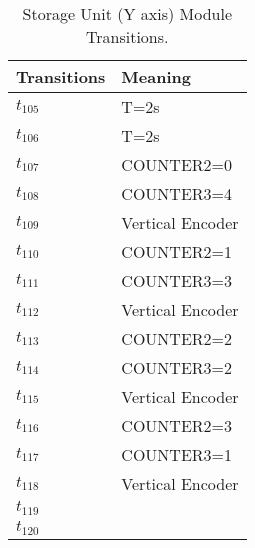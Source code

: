\begin{table}[H]
\caption{Storage Unit (Y axis) Module Transitions.}
\centering
\begin{tabular}{M{5cm}M{10cm}}
Transitions & Meaning\\
\hline
\hyperlink{partialNet:tt1051}{\hypertarget{partialTable:tt105}{$t_{105}$}} & T=2s\\
\hyperlink{partialNet:tt1061}{\hypertarget{partialTable:tt106}{$t_{106}$}} & T=2s\\
\hyperlink{partialNet:t1071}{\hypertarget{partialTable:t107}{$t_{107}$}} & COUNTER2=0\\
\hyperlink{partialNet:t1081}{\hypertarget{partialTable:t108}{$t_{108}$}} & COUNTER3=4\\
\hyperlink{partialNet:t1091}{\hypertarget{partialTable:t109}{$t_{109}$}} & Vertical Encoder\\
\hyperlink{partialNet:t1101}{\hypertarget{partialTable:t110}{$t_{110}$}} & COUNTER2=1\\
\hyperlink{partialNet:t1111}{\hypertarget{partialTable:t111}{$t_{111}$}} & COUNTER3=3\\
\hyperlink{partialNet:t1121}{\hypertarget{partialTable:t112}{$t_{112}$}} & Vertical Encoder\\
\hyperlink{partialNet:t1131}{\hypertarget{partialTable:t113}{$t_{113}$}} & COUNTER2=2\\
\hyperlink{partialNet:t1141}{\hypertarget{partialTable:t114}{$t_{114}$}} & COUNTER3=2\\
\hyperlink{partialNet:t1151}{\hypertarget{partialTable:t115}{$t_{115}$}} & Vertical Encoder\\
\hyperlink{partialNet:t1161}{\hypertarget{partialTable:t116}{$t_{116}$}} & COUNTER2=3\\
\hyperlink{partialNet:t1171}{\hypertarget{partialTable:t117}{$t_{117}$}} & COUNTER3=1\\
\hyperlink{partialNet:t1181}{\hypertarget{partialTable:t118}{$t_{118}$}} & Vertical Encoder\\
\hyperlink{partialNet:t1191}{\hypertarget{partialTable:t119}{$t_{119}$}} & \\
\hyperlink{partialNet:t1201}{\hypertarget{partialTable:t120}{$t_{120}$}} & \\
\end{tabular}
\end{table}
